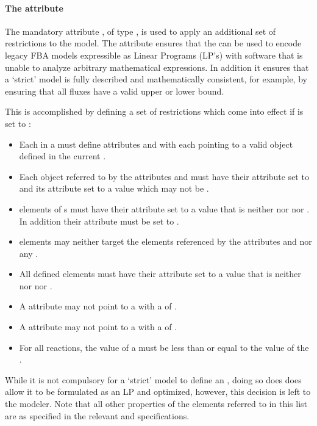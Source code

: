 \paragraph{The attribute }

The mandatory attribute , of type , is used to apply an additional set of restrictions to the model. The  attribute ensures that the \FBCPackage can be used to encode legacy FBA models expressible as Linear Programs (LP's) with software that is unable to analyze arbitrary mathematical expressions. In addition it ensures that a `strict' model is fully described and mathematically consistent, for example, by ensuring that all fluxes have a valid upper or lower bound.


This is accomplished by defining a set of restrictions which come into effect if  is set to :
%
\begin{itemize}
	\item { Each \Reaction in a \Model must define attributes  and  with each pointing to a valid \Parameter object defined in the current \Model.}
	\item {Each \Parameter object referred to by the \Reaction attributes  and  must have their  attribute set to  and its  attribute set to a  value which may not be .
	}
	\item { \SpeciesReference elements of {\Reaction}s must have their  attribute set to a  value that is neither  nor  nor . In addition their  attribute must be set to .
	}
	\item { \InitialAssignment elements may neither target the {\Parameter} elements referenced by the \Reaction attributes  and
	         nor any \SpeciesReference.
	}
	\item { All defined \FluxObjective elements must have their  attribute set to a  value that is neither  nor  nor .
	}
	\item { A \Reaction {} attribute may not point to a \Parameter with a  of .}
	\item { A \Reaction {} attribute may not point to a \Parameter with a  of .}
    \item {For all reactions, the value of a  must be less than or equal to the value of the .}

\end{itemize}
%
While it is not compulsory for a `strict' \FBC model to define an \Objective, doing so does does allow it to be formulated as an LP and optimized, however, this decision is left to the modeler. Note that all other properties of the elements referred to in this list are as specified in the relevant \sbmlthreecore and \FBC specifications.

